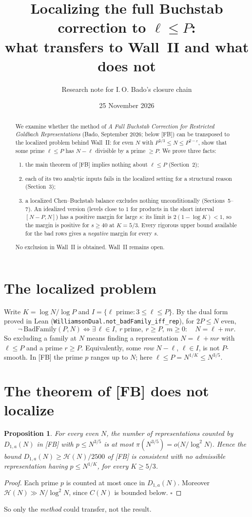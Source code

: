 \documentclass[11pt,a4paper]{article}
\title{Localizing the full Buchstab correction to $\ell\le P$:\\
what transfers to Wall~II and what does not}
\author{Research note for I.\,O. Bado's closure chain}
\date{25 November 2026}
\newtheorem{proposition}{Proposition}
\theoremstyle{remark}
\begin{document}
\maketitle

\begin{abstract}
We examine whether the method of \emph{A Full Buchstab Correction for Restricted Goldbach
Representations} (Bado, September 2026; below [FB]) can be transposed to the localized problem
behind Wall~II: for even $N$ with $P^{5/3}\le N\le P^{2-\varepsilon}$, show that some
prime $\ell\le P$ has $N-\ell$ divisible by a prime $\ge P$. We prove three facts:
\begin{enumerate}
\item the main theorem of [FB] implies nothing about $\ell\le P$ (Section~2);
\item each of its two analytic inputs fails in the localized setting for a structural reason
(Section~3);
\item a localized Chen--Buchstab balance excludes nothing unconditionally (Sections~5--7).
An idealized version (levels close to $1$ for products in the short interval $[N-P,N]$) has a
positive margin for large $s$: its limit is $2(1-\log K)<1$, so the margin is positive for
$s\ge40$ at $K=5/3$. Every rigorous upper bound available for the bad rows gives a
\emph{negative} margin for every $s$.
\end{enumerate}
No exclusion in Wall~II is obtained. Wall~II remains open.
\end{abstract}

\section{The localized problem}
Write $K=\log N/\log P$ and $I=\{\ell\text{ prime}:3\le\ell\le P\}$. By the dual form proved in
Lean (\texttt{WilliamsonDual.not\_badFamily\_iff\_rep}), for $2P\le N$ even,
\[
\neg\,\mathrm{BadFamily}(P,N)\iff \exists\,\ell\in I,\ r\ \text{prime},\ r\ge P,\ m\ge0:\quad
N=\ell+mr .
\]
So excluding a family at $N$ means finding a representation $N=\ell+mr$ with $\ell\le P$ and a
prime $r\ge P$. Equivalently, some \emph{row} $N-\ell$, $\ell\in I$, is not $P$-smooth. In [FB] the
prime $p$ ranges up to $N$; here $\ell\le P=N^{1/K}\le N^{3/5}$.

\section{The theorem of [FB] does not localize}
\begin{proposition}
For every even $N$, the number of representations counted by $D_{1,a}(N)$ in [FB] with $p\le
N^{3/5}$ is at most $\pi(N^{3/5})=o\bigl(N/\log^2N\bigr)$. Hence the bound $D_{1,a}(N)\ge
\mathcal H(N)/2500$ of [FB] is consistent with \emph{no} admissible representation having $p\le
N^{1/K}$, for every $K\ge5/3$.
\end{proposition}
\begin{proof}
Each prime $p$ is counted at most once in $D_{1,a}(N)$. Moreover $\mathcal H(N)\gg N/\log^2N$, since
$C(N)$ is bounded below. $\square$
\end{proof}
So only the \emph{method} could transfer, not the result.
\end{document}
